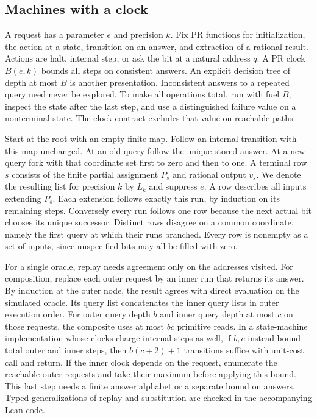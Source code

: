 \subsection{Machines with a clock}
A request has a parameter $e$ and precision $k$. Fix PR functions for initialization, the action at a state, transition on an answer, and extraction of a rational result. Actions are halt, internal step, or ask the bit at a natural address $q$. A PR clock $B(e,k)$ bounds all steps on consistent answers. An explicit decision tree of depth at most $B$ is another presentation. Inconsistent answers to a repeated query need never be explored. To make all operations total, run with fuel $B$, inspect the state after the last step, and use a distinguished failure value on a nonterminal state. The clock contract excludes that value on reachable paths.

Start at the root with an empty finite map. Follow an internal transition with this map unchanged. At an old query follow the unique stored answer. At a new query fork with that coordinate set first to zero and then to one. A terminal row $s$ consists of the finite partial assignment $P_s$ and rational output $v_s$. We denote the resulting list for precision $k$ by $L_k$ and suppress $e$. A row describes all inputs extending $P_s$. Each extension follows exactly this run, by induction on its remaining steps. Conversely every run follows one row because the next actual bit chooses its unique successor. Distinct rows disagree on a common coordinate, namely the first query at which their runs branched. Every row is nonempty as a set of inputs, since unspecified bits may all be filled with zero.

For a single oracle, replay needs agreement only on the addresses visited. For composition, replace each outer request by an inner run that returns its answer. By induction at the outer node, the result agrees with direct evaluation on the simulated oracle. Its query list concatenates the inner query lists in outer execution order. For outer query depth $b$ and inner query depth at most $c$ on those requests, the composite uses at most $bc$ primitive reads. In a state-machine implementation whose clocks charge internal steps as well, if $b,c$ instead bound total outer and inner steps, then $b(c+2)+1$ transitions suffice with unit-cost call and return. If the inner clock depends on the request, enumerate the reachable outer requests and take their maximum before applying this bound. This last step needs a finite answer alphabet or a separate bound on answers. Typed generalizations of replay and substitution are checked in the accompanying Lean code.

